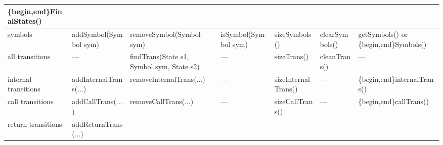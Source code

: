 \begin{sidewaystable}
\begin{threeparttable}
\begin{tabular}{p{0.75in}p{1.55in}p{1.6in}p{1.35in}p{1.27in}p{1.2in}p{1.5in}}
                                                                                                                                                                                             \{begin,end\}FinalStates()    \\
\hline %
symbols\tnote{2} &  addSymbol(Symbol sym)                   &  removeSymbol(Symbol sym)\tnote{5}        &  isSymbol(Symbol sym)      &  sizeSymbols()        &  clearSymbols()            &  getSymbols() or \newline
                                                                                                                                                                                             \{begin,end\}Symbols()         \\
\hline %
all \newline
transitions      &  ---                                     &  findTrans(State s1, Symbol sym, State s2)&  ---                       &  sizeTrans()          &  cleanTrans()              &  ---                           \\
internal \newline
transitions      &  addInternalTrans(\phantom{.}...\tnote{6}\phantom{a})
                                                            &  removeInternalTrans(\phantom{.}...\tnote{6}\phantom{a})
                                                                                                        &  ---                       &  sizeInternalTrans()  &  ---                       &  \{begin,end\}internalTrans()  \\
call \newline
transitions      &  addCallTrans(\phantom{.}...\tnote{6}\phantom{a})
                                                            &  removeCallTrans(\phantom{.}...\tnote{6}\phantom{a})
                                                                                                        &  ---                       &  sizeCallTrans()      &  ---                       &  \{begin,end\}callTrans()      \\
return \newline
transitions      &  addReturnTrans(\phantom{.}...\tnote{6}\phantom{a})

\end{tabular}
\end{threeparttable}
\end{sidewaystable}
